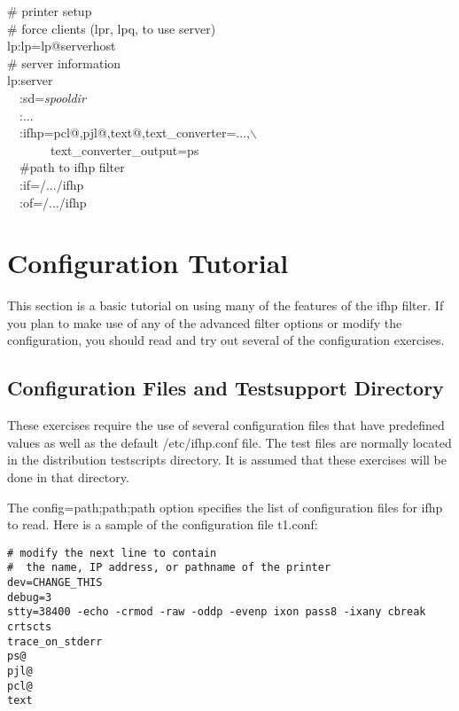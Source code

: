 \documentclass[a4paper]{article}
\begin{document}
\begin{tscreen}
\# printer setup  \\ 
\#  force clients (lpr, lpq, to use server)  \\ 
lp:lp=lp@serverhost  \\ 
\# server information  \\ 
lp:server  \\ 
~~:sd={\itshape spooldir\/}  \\ 
~~:...  \\ 
~~:ifhp=pcl@,pjl@,text@,text\_converter=...,$\backslash$ \\ 
~~~~~~~text\_converter\_output=ps~\\ 
~~\#path to ifhp filter  \\ 
~~:if=/.../ifhp  \\ 
~~:of=/.../ifhp  
\end{tscreen}





\section{Configuration Tutorial}

This section is a basic tutorial on using many of the features of
the
{\ttfamily ifhp}
filter.
If you plan to make use of any of the advanced filter options or
modify the configuration,
you should read and try out several of the
configuration exercises.


\subsection{Configuration Files and Testsupport Directory }

These exercises require the use of several configuration files
that have predefined values as well as the
default
{\ttfamily /etc/ifhp.conf} file.
The test files are normally located in the distribution 
{\ttfamily testscripts}
directory.
It is assumed that these exercises will be done in that
directory.

The
{\ttfamily config=path;path;path}
option specifies the list of configuration files for
{\ttfamily ifhp}
to read.
Here is a sample of the configuration file
{\ttfamily t1.conf}:
\begin{tscreen}
\begin{verbatim}
# modify the next line to contain
#  the name, IP address, or pathname of the printer
dev=CHANGE_THIS
debug=3
stty=38400 -echo -crmod -raw -oddp -evenp ixon pass8 -ixany cbreak crtscts
trace_on_stderr
ps@ 
pjl@
pcl@
text
\end{verbatim}
\end{tscreen}
\end{document}
